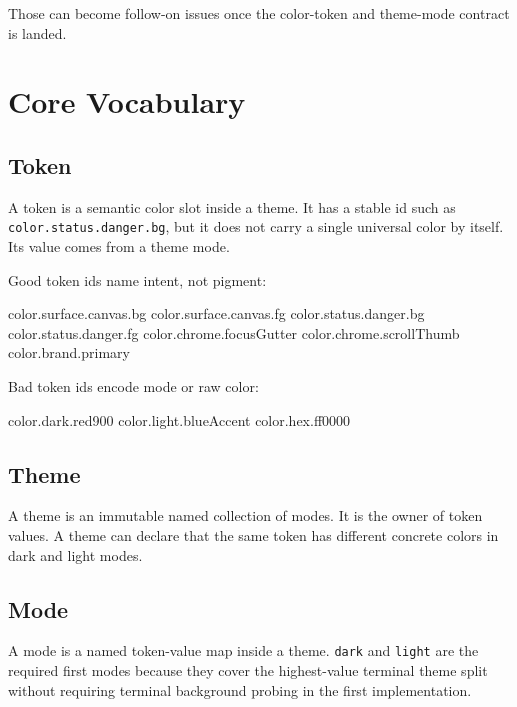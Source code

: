 Those can become follow-on issues once the color-token and theme-mode contract is landed.

\section{Core Vocabulary}\label{record-178-core-vocabulary}

\subsection{Token}\label{record-178-token}

A token is a semantic color slot inside a theme. It has a stable id such as \texttt{c\allowbreak{}o\allowbreak{}l\allowbreak{}o\allowbreak{}r\allowbreak{}.\allowbreak{}s\allowbreak{}t\allowbreak{}a\allowbreak{}t\allowbreak{}u\allowbreak{}s\allowbreak{}.\allowbreak{}d\allowbreak{}a\allowbreak{}n\allowbreak{}g\allowbreak{}e\allowbreak{}r\allowbreak{}.\allowbreak{}b\allowbreak{}g}, but it does not carry a single universal color by itself. Its value comes from a theme mode.

Good token ids name intent, not pigment:

\begin{CodeBlock}
color.surface.canvas.bg
color.surface.canvas.fg
color.status.danger.bg
color.status.danger.fg
color.chrome.focusGutter
color.chrome.scrollThumb
color.brand.primary
\end{CodeBlock}

Bad token ids encode mode or raw color:

\begin{CodeBlock}
color.dark.red900
color.light.blueAccent
color.hex.ff0000
\end{CodeBlock}

\subsection{Theme}\label{record-178-theme}

A theme is an immutable named collection of modes. It is the owner of token values. A theme can declare that the same token has different concrete colors in dark and light modes.

\subsection{Mode}\label{record-178-mode}

A mode is a named token-value map inside a theme. \texttt{d\allowbreak{}a\allowbreak{}r\allowbreak{}k} and \texttt{l\allowbreak{}i\allowbreak{}g\allowbreak{}h\allowbreak{}t} are the required first modes because they cover the highest-value terminal theme split without requiring terminal background probing in the first implementation.

